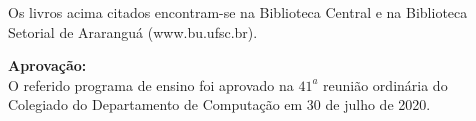 Os livros acima citados encontram-se na Biblioteca Central e na Biblioteca Setorial de Ararangu\'a (www.bu.ufsc.br).

\vskip1cm

{\bf Aprovação: }\\

O referido programa de ensino foi aprovado na $41^a$ reuni\~ao ordin\'aria do Colegiado do Departamento de Computa\c c\~ao em 30 de julho de 2020.

